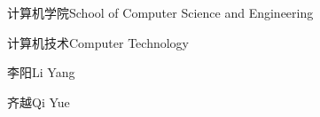 

\school
{计算机学院}{School of Computer Science and Engineering}

\major
{计算机技术}{Computer Technology}




\thesisauthor
{李阳}{Li Yang}

\teacher
{齐越}{Qi Yue}

\tercher
